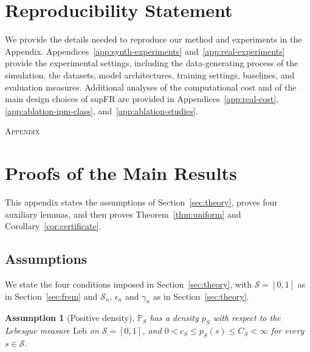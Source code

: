 \documentclass{article} %
\newtheorem{assumption}{Assumption}
\begin{document}
\section*{Reproducibility Statement}

We provide the details needed to reproduce our method and experiments in the Appendix.
Appendices~\ref{app:synth-experiments} and~\ref{app:real-experiments} provide the experimental settings, including the data-generating process of the simulation, the datasets, model architectures, training settings, baselines, and evaluation measures.
Additional analyses of the computational cost and of the main design choices of supFR are provided in Appendices~\ref{app:real-cost}, \ref{app:ablation-ipm-class}, and~\ref{app:ablation-studies}.



\newpage




\newpage
\appendix
\begin{center}
    {\LARGE \textsc{Appendix}}
\end{center}
\section{Proofs of the Main Results}
\label{app:proofs}

This appendix states the assumptions of Section~\ref{sec:theory}, proves four auxiliary lemmas, and then proves Theorem~\ref{thm:uniform} and Corollary~\ref{cor:certificate}.

\subsection{Assumptions}
\label{app:assumptions}

We state the four conditions imposed in Section~\ref{sec:theory}, with $\mathcal{S}=[0,1]$ as in Section~\ref{sec:frem} and $\mathcal{S}_n$, $\epsilon_n$ and $\gamma_n$ as in Section~\ref{sec:theory}.

\begin{assumption}[Positive density]
\label{as:positive-density}
$\mathbb{P}_S$ has a density $p_S$ with respect to the Lebesgue measure $\mathrm{Leb}$ on $\mathcal{S}=[0,1]$, and $0<c_S\le p_S(s)\le C_S<\infty$ for every $s\in\mathcal{S}$.
\end{assumption}
\end{document}
